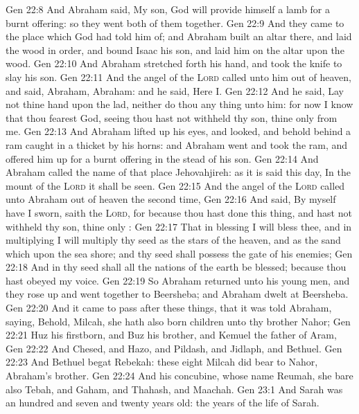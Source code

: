 \vs Gen 22:8 And Abraham said, My son, God will provide himself a lamb for a burnt offering: so they went both of them together.
\vs Gen 22:9 And they came to the place which God had told him of; and Abraham built an altar there, and laid the wood in order, and bound Isaac his son, and laid him on the altar upon the wood.
\vs Gen 22:10 And Abraham stretched forth his hand, and took the knife to slay his son.
\vs Gen 22:11 And the angel of the \textsc{Lord} called unto him out of heaven, and said, Abraham, Abraham: and he said, Here  I.
\vs Gen 22:12 And he said, Lay not thine hand upon the lad, neither do thou any thing unto him: for now I know that thou fearest God, seeing thou hast not withheld thy son, thine only  from me.
\vs Gen 22:13 And Abraham lifted up his eyes, and looked, and behold behind  a ram caught in a thicket by his horns: and Abraham went and took the ram, and offered him up for a burnt offering in the stead of his son.
\vs Gen 22:14 And Abraham called the name of that place Jehovahjireh: as it is said  this day, In the mount of the \textsc{Lord} it shall be seen.
\vs Gen 22:15 And the angel of the \textsc{Lord} called unto Abraham out of heaven the second time,
\vs Gen 22:16 And said, By myself have I sworn, saith the \textsc{Lord}, for because thou hast done this thing, and hast not withheld thy son, thine only :
\vs Gen 22:17 That in blessing I will bless thee, and in multiplying I will multiply thy seed as the stars of the heaven, and as the sand which  upon the sea shore; and thy seed shall possess the gate of his enemies;
\vs Gen 22:18 And in thy seed shall all the nations of the earth be blessed; because thou hast obeyed my voice.
\vs Gen 22:19 So Abraham returned unto his young men, and they rose up and went together to Beersheba; and Abraham dwelt at Beersheba.
\vs Gen 22:20 And it came to pass after these things, that it was told Abraham, saying, Behold, Milcah, she hath also born children unto thy brother Nahor;
\vs Gen 22:21 Huz his firstborn, and Buz his brother, and Kemuel the father of Aram,
\vs Gen 22:22 And Chesed, and Hazo, and Pildash, and Jidlaph, and Bethuel.
\vs Gen 22:23 And Bethuel begat Rebekah: these eight Milcah did bear to Nahor, Abraham's brother.
\vs Gen 22:24 And his concubine, whose name  Reumah, she bare also Tebah, and Gaham, and Thahash, and Maachah.
\vs Gen 23:1 And Sarah was an hundred and seven and twenty years old:  the years of the life of Sarah.
